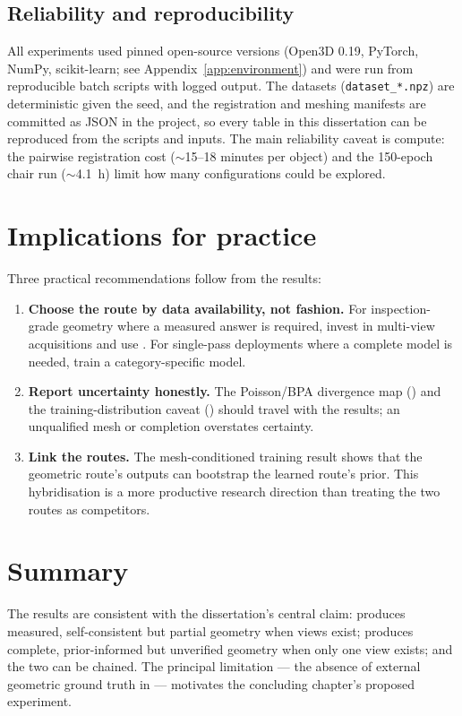 \subsection{Reliability and reproducibility}
All experiments used pinned open-source versions (Open3D 0.19, PyTorch, NumPy,
scikit-learn; see Appendix~\ref{app:environment}) and were run from
reproducible batch scripts with logged output. The datasets
(\texttt{dataset\_*.npz}) are deterministic given the seed, and the
registration and meshing manifests are committed as JSON in the project, so
every table in this dissertation can be reproduced from the scripts and
inputs. The main reliability caveat is compute: the pairwise registration cost
($\sim$15--18 minutes per object) and the 150-epoch chair run ($\sim$4.1~h)
limit how many configurations could be explored.

\section{Implications for practice}
\label{sec:disc_implications}

Three practical recommendations follow from the results:

\begin{enumerate}
  \item \textbf{Choose the route by data availability, not fashion.} For
  inspection-grade geometry where a measured answer is required, invest in
  multi-view acquisitions and use \routeA{}. For single-pass deployments where
  a complete model is needed, train a category-specific \routeB{} model.
  \item \textbf{Report uncertainty honestly.} The Poisson/BPA divergence map
  (\routeA{}) and the training-distribution caveat (\routeB{}) should travel
  with the results; an unqualified mesh or completion overstates certainty.
  \item \textbf{Link the routes.} The mesh-conditioned training result shows
  that the geometric route's outputs can bootstrap the learned route's prior.
  This hybridisation is a more productive research direction than treating the
  two routes as competitors.
\end{enumerate}

\section{Summary}
\label{sec:disc_summary}

The results are consistent with the dissertation's central claim: \routeA{}
produces measured, self-consistent but partial geometry when views exist;
\routeB{} produces complete, prior-informed but unverified geometry when only
one view exists; and the two can be chained. The principal limitation --- the
absence of external geometric ground truth in \suop{} --- motivates the
concluding chapter's proposed experiment.
